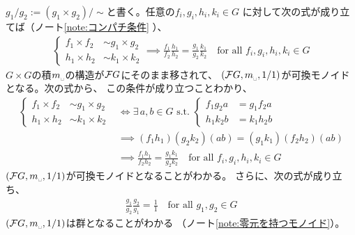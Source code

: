 {	$g_1/g_2:=(g_1\times g_2)/\sim$と書く。任意の$f_i,g_i,h_i,k_i\in G$
	に対して次の式が成り立てば（ノート\ref{note:コンパチ条件} ）、
	\begin{equation}\label{eq:分数化のコンパチ条件}\begin{split}
		\left\{\begin{split}
			f_1\times f_2 &\sim g_1\times g_2 \\
			h_1\times h_2 &\sim k_1\times k_2
		\end{split}\right.
		\implies \frac{f_1}{f_2}\frac{h_1}{h_2} = \frac{g_1}{g_2}\frac{k_1}{k_2}
		\quad\text{for all } f_i,g_i,h_i,k_i\in G
	\end{split}\end{equation}
	$G\times G$の積$m_\myspace$の構造が$\mathcal{F} G$にそのまま移されて、
	$(\calF G,m_\myspace,1/1)$が可換モノイドとなる。次の式から、
	この条件が成り立つことわかり、
	\begin{equation*}\begin{split}
		\left\{\begin{split}
			f_1\times f_2 &\sim g_1\times g_2 \\
			h_1\times h_2 &\sim k_1\times k_2
		\end{split}\right. &\iff \exists\, a,b\in G \text{ s.t. } 
		\left\{\begin{split}
			f_1g_2a &= g_1f_2a \\
			h_1k_2b &= k_1h_2b
		\end{split}\right. \\
		&\implies (f_1h_1)(g_2k_2)(ab) = (g_1k_1)(f_2h_2)(ab) \\
		&\implies \frac{f_1h_1}{f_2h_2} = \frac{g_1k_1}{g_2k_2}
		\quad\text{for all } f_i,g_i,h_i,k_i\in G
	\end{split}\end{equation*}
	$(\calF G,m_\myspace,1/1)$が可換モノイドとなることがわかる。
	さらに、次の式が成り立ち、
	\begin{equation*}\begin{split}
		\frac{g_1}{g_2}\frac{g_2}{g_1} = \frac{1}{1}
		\quad\text{for all } g_1,g_2\in G
	\end{split}\end{equation*}
	$(\calF G,m_\myspace,1/1)$は群となることがわかる
	（ノート\ref{note:零元を持つモノイド}）。

}
